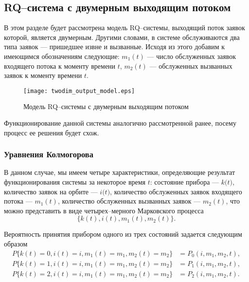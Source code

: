 \subsection{RQ--система с двумерным выходящим потоком} \label{section_simple_twodim}
В этом разделе будет рассмотрена модель RQ--системы, выходящий поток заявок которой, является двумерным. Другими словами, в системе обслуживаются два типа заявок --- пришедшее извне и вызванные. Исходя из этого добавим к имеющимся обозначениям следующие: \textit{$m_{1}(t)$} --- число обслуженных заявок входящего потока к моменту времени $\textit{t}$, \textit{$m_{2}(t)$} — обслуженных вызванных заявок к моменту времени $\textit{t}$.
\begin{figure}[H]
	\centering
	\texttt{[image: twodim\_output\_model.eps]}
	\caption{Модель RQ--системы с двумерным выходящим потоком}
	\label{twodim_output_model_fig}
\end{figure}
Функционирование данной системы аналогично рассмотренной ранее, посему процесс ее решения будет схож. 
\subsubsection{Уравнения Колмогорова}
В данном случае, мы имеем четыре характеристики, определяющие результат функционирования системы за некоторое время $t$: состояние прибора --- $\textit{k(t)}$, количество заявок на орбите --- $\textit{i(t)}$, количество обслуженных заявок входящего потока --- $m_{1}(t)$, количество обслуженных вызванных заявок --- $m_{2}(t)$,  что можно представить в виде четырех--мерного Марковского процесса
\begin{equation*}
	\{k(t),i(t),m_{1}(t),m_{2}(t)\}.
\end{equation*}

Вероятность принятия прибором одного из трех состояний задается следующим образом
\begin{equation*}
	\begin{split}
		P\{k(t)=0,i(t)=i,m_{1}(t)=m_{1},m_{2}(t)=m_{2}\} &=P_{0}(i,m_{1},m_{2},t),\\
		P\{k(t)=1,i(t)=i,m_{1}(t)=m_{1},m_{2}(t)=m_{2}\} &=P_{1}(i,m_{1},m_{2},t),\\
		P\{k(t)=2,i(t)=i,m_{1}(t)=m_{1},m_{2}(t)=m_{2}\} &=P_{2}(i,m_{1},m_{2},t).
	\end{split}
\end{equation*}

